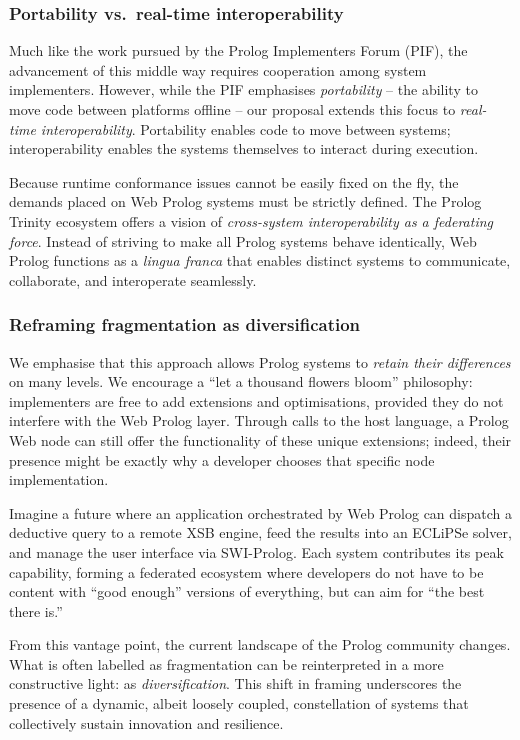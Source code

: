 \subsubsection{Portability vs.\ real-time interoperability}

Much like the work pursued by the Prolog Implementers Forum (PIF),
the advancement of this middle way requires cooperation among system
implementers. However, while the PIF emphasises \emph{portability}
-- the ability to move code between platforms offline -- our proposal
extends this focus to \emph{real-time interoperability}. Portability
enables code to move between systems; interoperability enables the
systems themselves to interact during execution.

Because runtime conformance issues cannot be easily fixed on the fly,
the demands placed on Web Prolog systems must be strictly defined.
The Prolog Trinity ecosystem offers a vision of \emph{cross-system
interoperability as a federating force}. Instead of striving to make
all Prolog systems behave identically, Web Prolog functions as a
\textit{lingua franca} that enables distinct systems to communicate,
collaborate, and interoperate seamlessly.


\subsubsection{Reframing fragmentation as diversification}

We emphasise that this approach allows Prolog systems to
\textit{retain their differences} on many levels. We encourage a
``let a thousand flowers bloom'' philosophy: implementers are free to
add extensions and optimisations, provided they do not interfere with
the Web Prolog layer. Through calls to the host language, a Prolog
Web node can still offer the functionality of these unique
extensions; indeed, their presence might be exactly why a developer
chooses that specific node implementation.

Imagine a future where an application orchestrated by Web Prolog can
dispatch a deductive query to a remote XSB engine, feed the results
into an ECLiPSe solver, and manage the user interface via
SWI-Prolog. Each system contributes its peak capability, forming a
federated ecosystem where developers do not have to be content with
``good enough'' versions of everything, but can aim for ``the best
there is.''

From this vantage point, the current landscape of the Prolog
community changes. What is often labelled as fragmentation can be
reinterpreted in a more constructive light: as \emph{diversification}.
This shift in framing underscores the presence of a dynamic, albeit
loosely coupled, constellation of systems that collectively sustain
innovation and resilience.


